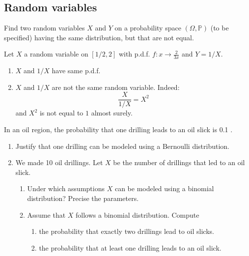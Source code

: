 \begin{center}
  \section*{Random variables}
\end{center}

\begin{Exercise}
  Find two random variables $X$ and $Y$ on a probability space $(\Omega, \mathbb{P})$ (to be specified) having the same distribution, but that are not equal.
\end{Exercise}

\begin{solution}
  Let $X$ a random variable on $[1/2, 2]$ with p.d.f. $f : x \to \frac{2}{3x}$ and $Y = 1/X$.
  \begin{enumerate}
    \item $X$ and $1/X$ have same p.d.f.
    \item $X$ and $1/X$ are not the same random variable. Indeed:
          $$\frac{X}{1/X} = X^2$$
          and $X^2$ is not equal to $1$ almost surely.
  \end{enumerate}
\end{solution}

\begin{Exercise}
  In an oil region, the probability that one drilling leads to an oil slick is 0.1 .
  \begin{enumerate}
    \item Justify that one drilling can be modeled using a Bernoulli distribution.
    \item We made 10 oil drillings. Let $X$ be the number of drillings that led to an oil slick.
          \begin{enumerate}
            \item Under which assumptions $X$ can be modeled using a binomial distribution? Precise the parameters.
            \item Assume that $X$ follows a binomial distribution. Compute
                  \begin{enumerate}
                    \item the probability that exactly two drillings lead to oil slicks.
                    \item the probability that at least one drilling leads to an oil slick.
                  \end{enumerate}
          \end{enumerate}
  \end{enumerate}
\end{Exercise}

